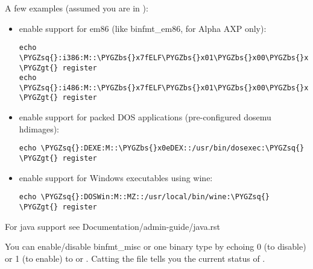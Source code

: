 \documentclass[a4paper,8pt,english]{sphinxmanual}
\def\PYGZbs{\char`\\}
\def\PYGZgt{\char`\>}
\def\PYGZsq{\char`\'}
\renewcommand\PYGZsq{\textquotesingle}
\begin{document}
A few examples (assumed you are in ):
\begin{itemize}
\item {} 
enable support for em86 (like binfmt\_em86, for Alpha AXP only):

\begin{Verbatim}[commandchars=\\\{\}]
echo \PYGZsq{}:i386:M::\PYGZbs{}x7fELF\PYGZbs{}x01\PYGZbs{}x00\PYGZbs{}x00\PYGZbs{}x00\PYGZbs{}x00\PYGZbs{}x00\PYGZbs{}x00\PYGZbs{}x00\PYGZbs{}x00\PYGZbs{}x00\PYGZbs{}x00\PYGZbs{}x00\PYGZbs{}x02\PYGZbs{}x00\PYGZbs{}x03:\PYGZbs{}xff\PYGZbs{}xff\PYGZbs{}xff\PYGZbs{}xff\PYGZbs{}xff\PYGZbs{}xfe\PYGZbs{}xfe\PYGZbs{}xff\PYGZbs{}xff\PYGZbs{}xff\PYGZbs{}xff\PYGZbs{}xff\PYGZbs{}xff\PYGZbs{}xff\PYGZbs{}xff\PYGZbs{}xff\PYGZbs{}xfb\PYGZbs{}xff\PYGZbs{}xff:/bin/em86:\PYGZsq{} \PYGZgt{} register
echo \PYGZsq{}:i486:M::\PYGZbs{}x7fELF\PYGZbs{}x01\PYGZbs{}x00\PYGZbs{}x00\PYGZbs{}x00\PYGZbs{}x00\PYGZbs{}x00\PYGZbs{}x00\PYGZbs{}x00\PYGZbs{}x00\PYGZbs{}x00\PYGZbs{}x00\PYGZbs{}x00\PYGZbs{}x02\PYGZbs{}x00\PYGZbs{}x06:\PYGZbs{}xff\PYGZbs{}xff\PYGZbs{}xff\PYGZbs{}xff\PYGZbs{}xff\PYGZbs{}xfe\PYGZbs{}xfe\PYGZbs{}xff\PYGZbs{}xff\PYGZbs{}xff\PYGZbs{}xff\PYGZbs{}xff\PYGZbs{}xff\PYGZbs{}xff\PYGZbs{}xff\PYGZbs{}xff\PYGZbs{}xfb\PYGZbs{}xff\PYGZbs{}xff:/bin/em86:\PYGZsq{} \PYGZgt{} register
\end{Verbatim}

\item {} 
enable support for packed DOS applications (pre-configured dosemu hdimages):

\begin{Verbatim}[commandchars=\\\{\}]
echo \PYGZsq{}:DEXE:M::\PYGZbs{}x0eDEX::/usr/bin/dosexec:\PYGZsq{} \PYGZgt{} register
\end{Verbatim}

\item {} 
enable support for Windows executables using wine:

\begin{Verbatim}[commandchars=\\\{\}]
echo \PYGZsq{}:DOSWin:M::MZ::/usr/local/bin/wine:\PYGZsq{} \PYGZgt{} register
\end{Verbatim}

\end{itemize}

For java support see Documentation/admin-guide/java.rst

You can enable/disable binfmt\_misc or one binary type by echoing 0 (to disable)
or 1 (to enable) to  or
.
Catting the file tells you the current status of .
\end{document}
